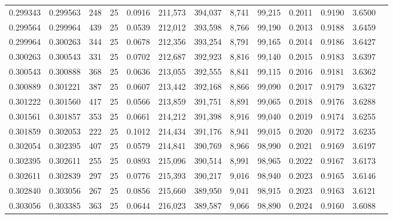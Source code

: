 \begin{tabular}{rrrrrrrrrrrrr}
0.299343 & 0.299563 &   248 &  25 &                                     0.0916 & 211,573 & 394,037 &   8,741 &  99,215 & 0.2011 & 0.9190 & 3.6500 \\
0.299564 & 0.299964 &   439 &  25 &                                     0.0539 & 212,012 & 393,598 &   8,766 &  99,190 & 0.2013 & 0.9188 & 3.6459 \\
0.299964 & 0.300263 &   344 &  25 &                                     0.0678 & 212,356 & 393,254 &   8,791 &  99,165 & 0.2014 & 0.9186 & 3.6427 \\
0.300263 & 0.300543 &   331 &  25 &                                     0.0702 & 212,687 & 392,923 &   8,816 &  99,140 & 0.2015 & 0.9183 & 3.6397 \\
0.300543 & 0.300888 &   368 &  25 &                                     0.0636 & 213,055 & 392,555 &   8,841 &  99,115 & 0.2016 & 0.9181 & 3.6362 \\
0.300889 & 0.301221 &   387 &  25 &                                     0.0607 & 213,442 & 392,168 &   8,866 &  99,090 & 0.2017 & 0.9179 & 3.6327 \\
0.301222 & 0.301560 &   417 &  25 &                                     0.0566 & 213,859 & 391,751 &   8,891 &  99,065 & 0.2018 & 0.9176 & 3.6288 \\
0.301561 & 0.301857 &   353 &  25 &                                     0.0661 & 214,212 & 391,398 &   8,916 &  99,040 & 0.2019 & 0.9174 & 3.6255 \\
0.301859 & 0.302053 &   222 &  25 &                                     0.1012 & 214,434 & 391,176 &   8,941 &  99,015 & 0.2020 & 0.9172 & 3.6235 \\
0.302054 & 0.302395 &   407 &  25 &                                     0.0579 & 214,841 & 390,769 &   8,966 &  98,990 & 0.2021 & 0.9169 & 3.6197 \\
0.302395 & 0.302611 &   255 &  25 &                                     0.0893 & 215,096 & 390,514 &   8,991 &  98,965 & 0.2022 & 0.9167 & 3.6173 \\
0.302611 & 0.302839 &   297 &  25 &                                     0.0776 & 215,393 & 390,217 &   9,016 &  98,940 & 0.2023 & 0.9165 & 3.6146 \\
0.302840 & 0.303056 &   267 &  25 &                                     0.0856 & 215,660 & 389,950 &   9,041 &  98,915 & 0.2023 & 0.9163 & 3.6121 \\
0.303056 & 0.303385 &   363 &  25 &                                     0.0644 & 216,023 & 389,587 &   9,066 &  98,890 & 0.2024 & 0.9160 & 3.6088 \\

\end{tabular}
